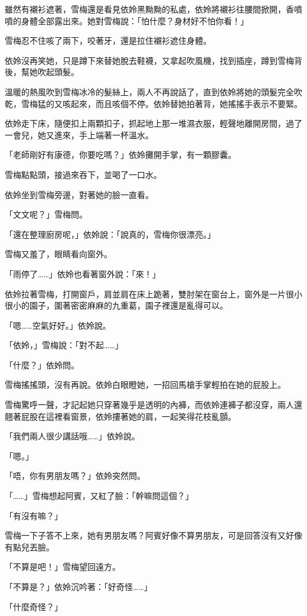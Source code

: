 雖然有襯衫遮著，雪梅還是看見依姈黑黝黝的私處，依姈將襯衫往腰間掀開，香噴噴的身體全部露出來。她對雪梅說：「怕什麼？身材好不怕你看！」

雪梅忍不住咳了兩下，咬著牙，還是拉住襯衫遮住身體。

依姈沒再笑她，只是蹲下來替她脫去鞋襪，又拿起吹風機，找到插座，蹲到雪梅背後，幫她吹起頭髮。

溫暖的熱風吹到雪梅冰冷的髮絲上，兩人不再說話了，直到依姈將她的頭髮完全吹乾，雪梅猛的又咳起來，而且咳個不停。依姈替她拍著背，她搖搖手表示不要緊。

依姈走下床，隨便扣上兩顆扣子，抓起地上那一堆濕衣服，輕聲地離開房間，過了一會兒，她又進來，手上端著一杯溫水。

「老師剛好有康德，你要吃嗎？」依姈攤開手掌，有一顆膠囊。

雪梅點點頭，接過來吞下，並喝了一口水。

依姈坐到雪梅旁邊，對著她的臉一直看。

「文文呢？」雪梅問。

「還在整理廚房呢，」依姈說：「說真的，雪梅你很漂亮。」

雪梅又羞了，眼睛看向窗外。

「雨停了……」依姈也看著窗外說：「來！」

依姈拉著雪梅，打開窗戶，肩並肩在床上跪著，雙肘架在窗台上，窗外是一片很小很小的園子，圍著密密麻麻的九重葛，園子裡還是亂得可以。

「嗯……空氣好好。」依姈說。

「依姈，」雪梅說：「對不起……」

「什麼？」依姈問。

雪梅搖搖頭，沒有再說。依姈白眼瞪她，一招回馬槍手掌輕拍在她的屁股上。

雪梅驚呼一聲，才記起她只穿著幾乎是透明的內褲，而依姈連褲子都沒穿，兩人還翹著屁股在這裡看窗景，依姈摟著她的肩，一起笑得花枝亂顫。

「我們兩人很少講話哦……」依姈說。

「嗯。」

「唔，你有男朋友嗎？」依姈突然問。

「……」雪梅想起阿賓，又紅了臉：「幹嘛問這個？」

「有沒有嘛？」

雪梅一下子答不上來，她有男朋友嗎？阿賓好像不算男朋友，可是回答沒有又好像有點兒丟臉。

「不算是吧！」雪梅望回遠方。

「不算是？」依姈沉吟著：「好奇怪……」

「什麼奇怪？」

